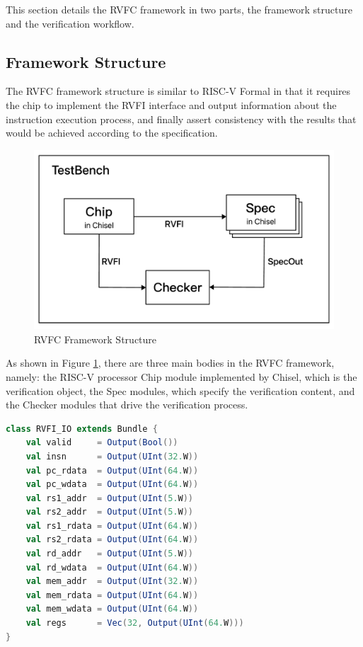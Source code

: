 \documentclass[conference]{IEEEtran}
\theoremstyle{definition}
\begin{document}
This section details the RVFC framework in two parts, the framework structure and the verification workflow.

\subsection{Framework Structure}
The RVFC framework structure is similar to RISC-V Formal in that it requires the chip to implement the RVFI interface and output information about the instruction execution process, and finally assert consistency with the results that would be achieved according to the specification.

\begin{figure}[!htbp]
    \begin{center}
    \includegraphics[width=1\linewidth]{pics/rvfc.pdf}
    \caption{RVFC Framework Structure}
    \label{fig: rvfc structure}
    \end{center}
\end{figure}

As shown in Figure \ref{fig: rvfc structure}, there are three main bodies in the RVFC framework, namely: the RISC-V processor Chip module implemented by Chisel, which is the verification object, the Spec modules, which specify the verification content, and the Checker modules that drive the verification process.

\begin{lstlisting}[language=scala, caption={RVFI Definition in RVFC}, label=rvfic]
class RVFI_IO extends Bundle {
    val valid     = Output(Bool())
    val insn      = Output(UInt(32.W))
    val pc_rdata  = Output(UInt(64.W))
    val pc_wdata  = Output(UInt(64.W))
    val rs1_addr  = Output(UInt(5.W))
    val rs2_addr  = Output(UInt(5.W))
    val rs1_rdata = Output(UInt(64.W))
    val rs2_rdata = Output(UInt(64.W))
    val rd_addr   = Output(UInt(5.W))
    val rd_wdata  = Output(UInt(64.W))
    val mem_addr  = Output(UInt(32.W))
    val mem_rdata = Output(UInt(64.W))
    val mem_wdata = Output(UInt(64.W))
    val regs      = Vec(32, Output(UInt(64.W)))
}
\end{lstlisting}
\end{document}
